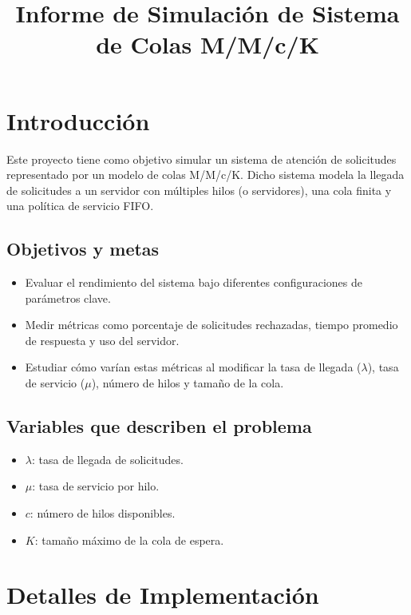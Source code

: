 \documentclass[a4paper,12pt]{article}
\title{Informe de Simulación de Sistema de Colas M/M/c/K}
\author{}
\date{}
\begin{document}
\maketitle

\section{Introducción}

Este proyecto tiene como objetivo simular un sistema de atención de solicitudes representado por un modelo de colas M/M/c/K. Dicho sistema modela la llegada de solicitudes a un servidor con múltiples hilos (o servidores), una cola finita y una política de servicio FIFO.

\subsection*{Objetivos y metas}

\begin{itemize}
    \item Evaluar el rendimiento del sistema bajo diferentes configuraciones de parámetros clave.
    \item Medir métricas como porcentaje de solicitudes rechazadas, tiempo promedio de respuesta y uso del servidor.
    \item Estudiar cómo varían estas métricas al modificar la tasa de llegada (\( \lambda \)), tasa de servicio (\( \mu \)), número de hilos y tamaño de la cola.
\end{itemize}

\subsection*{Variables que describen el problema}

\begin{itemize}
    \item \( \lambda \): tasa de llegada de solicitudes.
    \item \( \mu \): tasa de servicio por hilo.
    \item \( c \): número de hilos disponibles.
    \item \( K \): tamaño máximo de la cola de espera.
\end{itemize}

\section{Detalles de Implementación}
\end{document}
